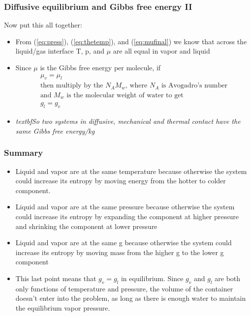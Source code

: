 \documentclass[hyperref={colorlinks=true,linkcolor=blue,urlcolor=blue},numbers]{beamer}
\begin{document}
\begin{frame}
  \frametitle{Diffusive equilibrium and Gibbs free energy II}

Now put this all together:
\begin{itemize}
\item From (\ref{eq:press}), (\ref{eq:thetemp}), and (\ref{eq:mufinal}) 
we know that across the liquid/gas
interface T, p, and $\mu$ are all equal in vapor and liquid
\item Since $\mu$ is the Gibbs free energy per molecule, if
  \begin{gather*}
    \mu_v = \mu_l\\
\text{then multiply by the $N_A M_w$, where $N_A$ is Avogadro's number}\\
\text{and $M_w$ is the molecular weight of water to get}\\
g_l = g_v
  \end{gather*}


   \item \textit{textbf{So two systems in diffusive, mechanical and
thermal  contact have the same Gibbs free energy/kg}}
  \end{itemize}

\end{frame}

\begin{frame}
  \frametitle{Summary}

\begin{itemize}
\item Liquid and vapor are at the same temperature because otherwise the
system could increase its entropy by moving energy from 
the hotter to colder component.
\item Liquid and vapor are at the same pressure because otherwise
the system could increase its entropy by expanding the component at higher
pressure  and shrinking the component at lower pressure
\item Liquid and vapor are at the same g because otherwise the
system could increase its entropy by moving mass from the higher g to
the lower g component
\item This last point means that $g_v = g_l$ in equilibrium.  Since
$g_v$ and $g_l$ are both only functions of temperature and pressure,
the volume of the container doesn't enter into the problem, as long
as there is enough water to maintain the equilibrium vapor pressure.
\end{itemize}


\end{frame}
\end{document}
